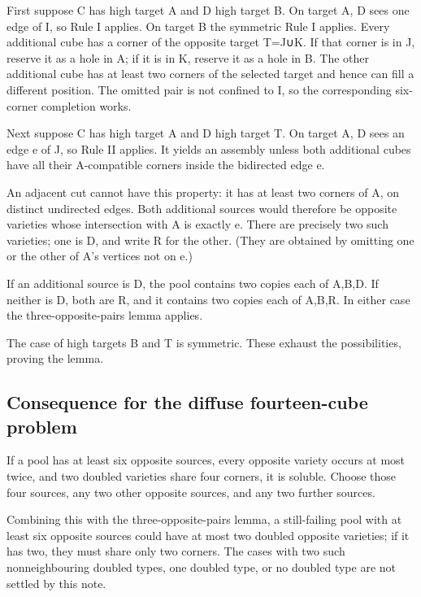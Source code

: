 \documentclass[
  10pt,
]{article}
\begin{document}
First suppose C has high target A and D high target B. On target A, D
sees one edge of I, so Rule I applies. On target B the symmetric Rule I
applies. Every additional cube has a corner of the opposite target
T=J∪K. If that corner is in J, reserve it as a hole in A; if it is in K,
reserve it as a hole in B. The other additional cube has at least two
corners of the selected target and hence can fill a different position.
The omitted pair is not confined to I, so the corresponding six-corner
completion works.

Next suppose C has high target A and D high target T. On target A, D
sees an edge e of J, so Rule II applies. It yields an assembly unless
both additional cubes have all their A-compatible corners inside the
bidirected edge e.

An adjacent cut cannot have this property: it has at least two corners
of A, on distinct undirected edges. Both additional sources would
therefore be opposite varieties whose intersection with A is exactly e.
There are precisely two such varieties; one is D, and write R for the
other. (They are obtained by omitting one or the other of A's vertices
not on e.)

If an additional source is D, the pool contains two copies each of
A,B,D. If neither is D, both are R, and it contains two copies each of
A,B,R. In either case the three-opposite-pairs lemma applies.

The case of high targets B and T is symmetric. These exhaust the
possibilities, proving the lemma.

\hypertarget{consequence-for-the-diffuse-fourteen-cube-problem}{%
\subsection*{Consequence for the diffuse fourteen-cube
problem}\label{consequence-for-the-diffuse-fourteen-cube-problem}}

If a pool has at least six opposite sources, every opposite variety
occurs at most twice, and two doubled varieties share four corners, it
is soluble. Choose those four sources, any two other opposite sources,
and any two further sources.

Combining this with the three-opposite-pairs lemma, a still-failing pool
with at least six opposite sources could have at most two doubled
opposite varieties; if it has two, they must share only two corners. The
cases with two such nonneighbouring doubled types, one doubled type, or
no doubled type are not settled by this note.
\end{document}
